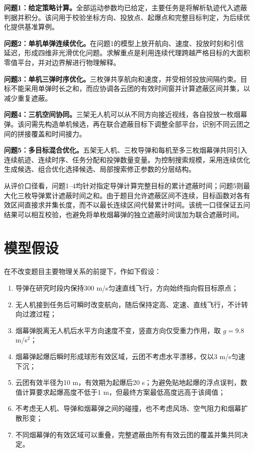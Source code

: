 \documentclass[12pt,a4paper]{ctexart}
\begin{document}
\textbf{问题1：给定策略计算。}全部运动参数均已给定，主要任务是将解析轨迹代入遮蔽判据并积分。该问用于校验坐标方向、投放点、起爆点和完整目标判定，为后续优化提供基准算例。

\textbf{问题2：单机单弹连续优化。}在问题1的模型上放开航向、速度、投放时刻和引信延迟，形成四维非光滑优化问题。求解重点是利用连续代理跨越严格目标的大面积零值平台，并对边界解进行物理解释。

\textbf{问题3：单机三弹时序优化。}三枚弹共享航向和速度，并受相邻投放间隔约束。目标不能采用单弹时长之和，而应协调各云团的有效时间窗并计算遮蔽区间并集，以减少重复遮蔽。

\textbf{问题4：三机空间协同。}三架无人机可以从不同方向接近视线，各自投放一枚烟幕弹。该问需先构造单机候选，再在联合遮蔽目标下调整全部平台，识别不同云团之间的拼接覆盖和时间接力。

\textbf{问题5：多目标混合优化。}五架无人机、三枚导弹和每机至多三枚烟幕弹共同引入连续航迹、连续时序、任务分配和投弹数量变量。为控制搜索规模，采用连续优化生成候选、组合优化选择候选、局部搜索修正参数的分层结构。

从评价口径看，问题1--4均针对指定导弹计算完整目标的累计遮蔽时间；问题5则最大化三枚导弹累计遮蔽时间之和。由于题目允许遮蔽区间不连续，目标函数对各有效区间直接求并集长度，而不以最长连续区间代替累计时间。该统一口径保证五问结果可以相互校验，也避免将单枚烟幕弹的独立遮蔽时间误加为联合遮蔽时间。

\section{模型假设}

在不改变题目主要物理关系的前提下，作如下假设：

\begin{enumerate}[label=\arabic*)]
\item 导弹在研究时段内保持300 m/s匀速直线飞行，方向始终指向假目标原点；
\item 无人机接到任务后可瞬时改变航向，随后保持定高、定速、直线飞行，不计转向过渡过程；
\item 烟幕弹脱离无人机后水平方向速度不变，竖直方向仅受重力作用，取 $g=9.8$ m/s$^2$；
\item 烟幕弹起爆后瞬时形成球形有效区域，云团不考虑水平漂移，仅以3 m/s匀速下沉；
\item 云团有效半径为10 m，有效期为起爆后20 s；为避免贴地起爆的浮点误判，数值计算要求起爆高度不低于1 m，但最终方案最低高度远高于该阈值；
\item 不考虑无人机、导弹和烟幕弹之间的碰撞，也不考虑风场、空气阻力和烟幕扩散形变；
\item 不同烟幕弹的有效区域可以重叠，完整遮蔽由所有有效云团的覆盖并集共同决定。
\end{enumerate}
\end{document}

